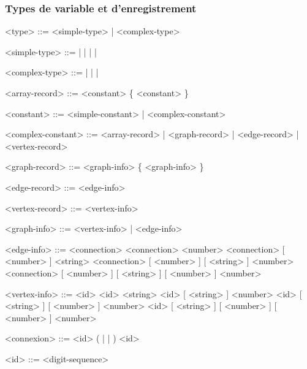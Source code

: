 \documentclass[french]{article}
\begin{document}
	\subsubsection{Types de variable et d'enregistrement}
	\begin{grammar}
		<type> ::= <simple-type> | <complex-type>
		
		<simple-type> ::=  |  |  |  | 
		
		<complex-type> ::=  |  |  | 
		
		<array-record> ::= \lit{[} <constant> \{ \lit{,} <constant> \} \lit{]}
		
		<constant> ::= <simple-constant> | <complex-constant>
		
		<complex-constant> ::= <array-record> | <graph-record> | <edge-record> | <vertex-record>
		
		<graph-record> ::= \lit{\{} <graph-info> \{ \lit{,} <graph-info> \} \lit{\}}
		
		<edge-record> ::= \lit{(} <edge-info> \lit{)}
		
		<vertex-record> ::= \lit{(} <vertex-info> \lit{)}
		
		<graph-info> ::= <vertex-info> | <edge-info>
		
		<edge-info> ::= <connection> 
		\alt <connection> \lit{:} <number>
		\alt <connection> \lit{:} [ <number> ] \lit{:} <string>
		\alt <connection> \lit{:} [ <number> ] \lit{:} [ <string> ] \lit{:} <number>
		\alt <connection> \lit{:} [ <number> ] \lit{:} [ <string> ] \lit{:} [ <number> ] \lit{:} <number>
		
		<vertex-info> ::= <id> 
		\alt <id> \lit{:} <string>
		\alt <id> \lit{:} [ <string> ] \lit{:} <number>
		\alt <id> \lit{:} [ <string> ] \lit{:} [ <number> ] \lit{:} <number>
		\alt <id> \lit{:} [ <string> ] \lit{:} [ <number> ] \lit{:} [ <number> ] \lit{:} <number>
		
		<connexion> ::= <id> ( \lit{\textendash\textemdash} | \lit{\textemdash\textgreater} | \lit{\textless\textemdash} ) <id>
		
		<id> ::= <digit-sequence>
	\end{grammar}
	
\end{document}
